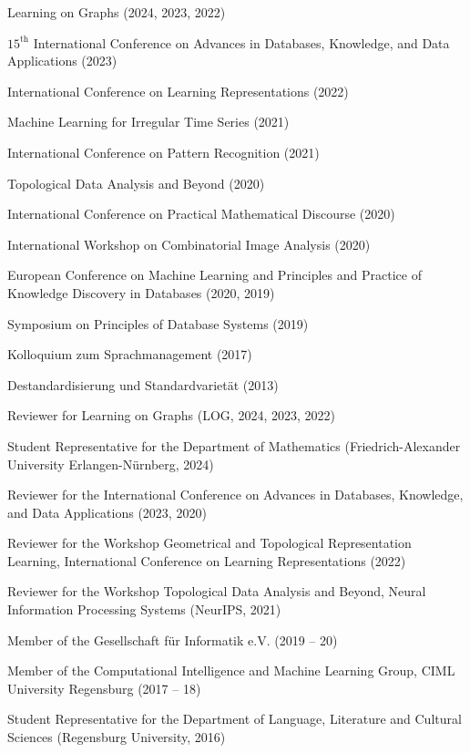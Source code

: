 \documentclass[a4paper, 12pt]{article}
\newcommand{\years}[1]{\marginnote{\scriptsize #1}}
\begin{document}
\years{Conferences}
\vspace{-10pt}
\begin{etaremune}[itemsep=-5pt, leftmargin=15pt]
	\item Learning on Graphs (2024, 2023, 2022)
	\item $15^{\text{th}}$ International Conference on Advances in Databases, Knowledge, and Data Applications (2023)
	\item International Conference on Learning Representations (2022)
	\item Machine Learning for Irregular Time Series (2021)
	\item International Conference on Pattern Recognition (2021)
	\item Topological Data Analysis and Beyond (2020)
	\item International Conference on Practical Mathematical Discourse (2020)
	\item International Workshop on Combinatorial Image Analysis (2020)
	\item European Conference on Machine Learning and Principles and Practice of Knowledge Discovery in Databases (2020, 2019)
	\item Symposium on Principles of Database Systems (2019)
	\item Kolloquium zum Sprachmanagement (2017)
	\item Destandardisierung und Standardvarietät (2013)
\end{etaremune}
\vspace{10pt}

\years{Service}
\vspace{-10pt}
\begin{etaremune}[itemsep=-5pt, leftmargin=15pt]
	\item Reviewer for Learning on Graphs (LOG, 2024, 2023, 2022)
	\item Student Representative for the Department of Mathematics (Friedrich-Alexander University Erlangen-Nürnberg, 2024)
	\item Reviewer for the International Conference on Advances in Databases, Knowledge, and Data Applications (2023, 2020)
	\item Reviewer for the Workshop Geometrical and Topological Representation Learning, International Conference on Learning Representations (2022)
	\item Reviewer for the Workshop Topological Data Analysis and Beyond, Neural Information Processing Systems (NeurIPS, 2021)
	\item Member of the Gesellschaft für Informatik e.V. (2019 -- 20)
	\item Member of the Computational Intelligence and Machine Learning Group, CIML University Regensburg (2017 -- 18)
	\item Student Representative for the Department of Language, Literature and Cultural Sciences (Regensburg University, 2016)
\end{etaremune}
\vspace{10pt}
\end{document}
